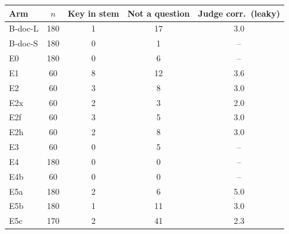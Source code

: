 \begin{tabular}{@{}lcccc@{}}
\toprule
Arm & $n$ & Key in stem & Not a question & Judge corr.\ (leaky) \\
\midrule
B-doc-L & 180 & 1 & 17 & 3.0 \\
B-doc-S & 180 & 0 & 1 & -- \\
E0 & 180 & 0 & 6 & -- \\
E1 & 60 & 8 & 12 & 3.6 \\
E2 & 60 & 3 & 8 & 3.0 \\
E2x & 60 & 2 & 3 & 2.0 \\
E2f & 60 & 3 & 5 & 3.0 \\
E2h & 60 & 2 & 8 & 3.0 \\
E3 & 60 & 0 & 5 & -- \\
E4 & 180 & 0 & 0 & -- \\
E4b & 60 & 0 & 0 & -- \\
E5a & 180 & 2 & 6 & 5.0 \\
E5b & 180 & 1 & 11 & 3.0 \\
E5c & 170 & 2 & 41 & 2.3 \\
\bottomrule
\end{tabular}
